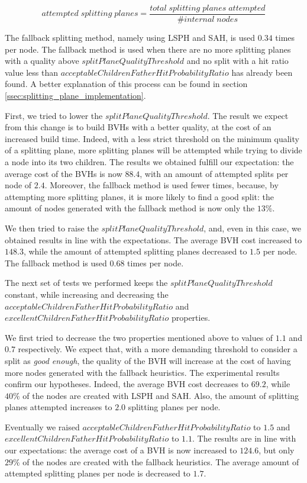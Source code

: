 \documentclass{PoliMi_MasterThesis}
\begin{document}
$$attempted \; splitting \; planes = \frac{total\;splitting\;planes\;attempted}{\#internal\;nodes}$$

The fallback splitting method, namely using LSPH and SAH, is used $0.34$ times per node. The fallback method is used when there are no more splitting planes with a quality above $splitPlaneQualityThreshold$ and no split with a hit ratio value less than $acceptableChildrenFatherHitProbabilityRatio$ has already been found. A better explanation of this process can be found in section \ref{ssec:splitting_plane_implementation}.

First, we tried to lower the $splitPlaneQualityThreshold$. The result we expect from this change is to build BVHs with a better quality, at the cost of an increased build time. Indeed, with a less strict threshold on the minimum quality of a splitting plane, more splitting planes will be attempted while trying to divide a node into its two children. The results we obtained fulfill our expectation: the average cost of the BVHs is now $88.4$, with an amount of attempted splits per node of $2.4$. Moreover, the fallback method is used fewer times, because, by attempting more splitting planes, it is more likely to find a good split: the amount of nodes generated with the fallback method is now only the $13\%$.

We then tried to raise the $splitPlaneQualityThreshold$, and, even in this case, we obtained results in line with the expectations. The average BVH cost increased to $148.3$, while the amount of attempted splitting planes decreased to $1.5$ per node. The fallback method is used $0.68$ times per node.

The next set of tests we performed keeps the $splitPlaneQualityThreshold$ constant, while increasing and decreasing the $acceptableChildrenFatherHitProbabilityRatio$ and $excellentChildrenFatherHitProbabilityRatio$ properties.

We first tried to decrease the two properties mentioned above to values of $1.1$ and $0.7$ respectively. We expect that, with a more demanding threshold to consider a split as \textit{good enough}, the quality of the BVH will increase at the cost of having more nodes generated with the fallback heuristics. The experimental results confirm our hypotheses. Indeed, the average BVH cost decreases to $69.2$, while $40\%$ of the nodes are created with LSPH and SAH. Also, the amount of splitting planes attempted increases to $2.0$ splitting planes per node.

Eventually we raised $acceptableChildrenFatherHitProbabilityRatio$ to $1.5$ and \\$excellentChildrenFatherHitProbabilityRatio$ to $1.1$. The results are in line with our expectations: the average cost of a BVH is now increased to $124.6$, but only $29\%$ of the nodes are created with the fallback heuristics. The average amount of attempted splitting planes per node is decreased to $1.7$.
\end{document}
